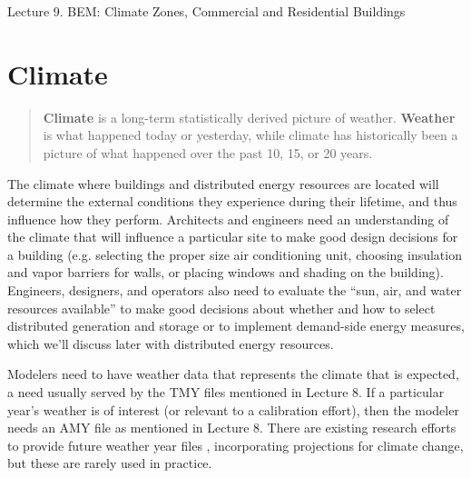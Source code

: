 \documentclass[10pt]{article}
\begin{document}
   \noindent
   \begin{center}

   \hrulefill
   
   \vspace{5pt}
   
   \vspace{0pt}
   
   {\Large \hfill  Lecture 9. BEM: Climate Zones, Commercial and Residential Buildings}
   \vspace{5pt}
   
  
   \hrulefill
   \end{center}

{}

\section{Climate}

\begin{quote}
\textbf{Climate} is a long-term statistically derived picture of weather. \textbf{Weather} is what happened today or yesterday, while climate has historically been a picture of what happened over the past 10, 15, or 20 years. \cite{Grondzik2014-gt}
\end{quote}

The climate where buildings and distributed energy resources are located will determine the external conditions they experience during their lifetime, and thus influence how they perform. Architects and engineers need an understanding of the climate that will influence a particular site to make good design decisions for a building (e.g. selecting the proper size air conditioning unit, choosing insulation and vapor barriers for walls, or placing windows and shading on the building). Engineers, designers, and operators also need to evaluate the ``sun, air, and water resources available'' to make good decisions about whether and how to select distributed generation and storage or to implement demand-side energy measures, which we'll discuss later with distributed energy resources.

Modelers need to have weather data that represents the climate that is expected, a need usually served by the TMY files mentioned in Lecture 8. If a particular year's weather is of interest (or relevant to a calibration effort), then the modeler needs an AMY file as mentioned in Lecture 8. There are existing research efforts to provide future weather year files \cite{C_Bianchi_DL_Mendoza_RC_Didier_TD_Tran_AD_Smith2017-uk}, incorporating projections for climate change, but these are rarely used in practice.
\end{document}

